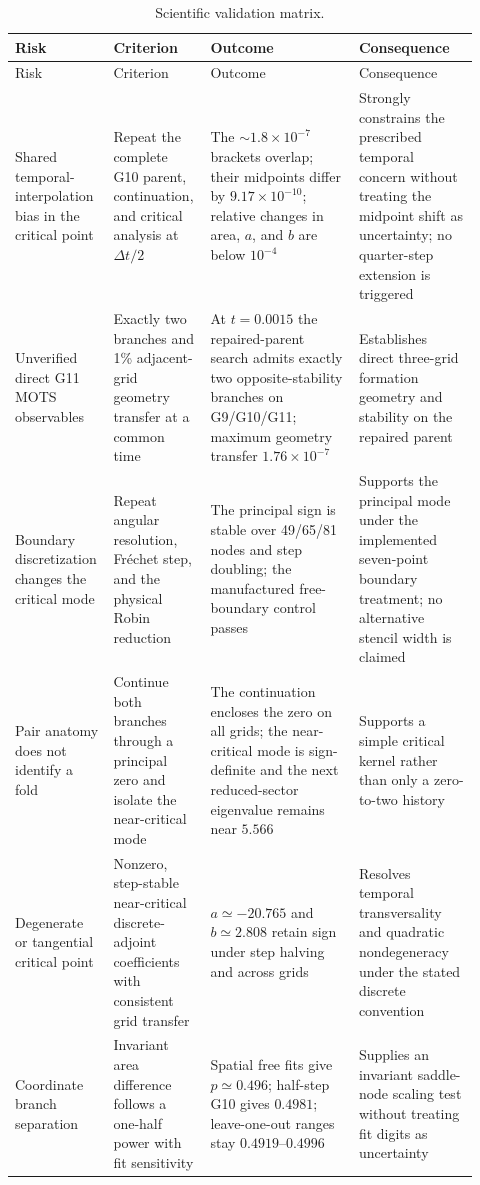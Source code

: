 \documentclass[11pt]{article}
\begin{document}
\renewcommand{\arraystretch}{1.18}
\small
\begin{longtable}{@{}L{0.17\linewidth}L{0.19\linewidth}L{0.31\linewidth}L{0.25\linewidth}@{}}
\caption{Scientific validation matrix.}\label{tab:validation}\\
\toprule
Risk & Criterion & Outcome & Consequence \\
\midrule
\endfirsthead
\toprule
Risk & Criterion & Outcome & Consequence \\
\midrule
\endhead
Shared temporal-interpolation bias in the critical point & Repeat the complete G10 parent, continuation, and critical analysis at $\Delta t/2$ & The $\sim1.8\times10^{-7}$ brackets overlap; their midpoints differ by $9.17\times10^{-10}$; relative changes in area, $a$, and $b$ are below $10^{-4}$ & Strongly constrains the prescribed temporal concern without treating the midpoint shift as uncertainty; no quarter-step extension is triggered \\
Unverified direct G11 MOTS observables & Exactly two branches and 1\% adjacent-grid geometry transfer at a common time & At $t=0.0015$ the repaired-parent search admits exactly two opposite-stability branches on G9/G10/G11; maximum geometry transfer $1.76\times10^{-7}$ & Establishes direct three-grid formation geometry and stability on the repaired parent \\
Boundary discretization changes the critical mode & Repeat angular resolution, Fr\'echet step, and the physical Robin reduction & The principal sign is stable over 49/65/81 nodes and step doubling; the manufactured free-boundary control passes & Supports the principal mode under the implemented seven-point boundary treatment; no alternative stencil width is claimed \\
Pair anatomy does not identify a fold & Continue both branches through a principal zero and isolate the near-critical mode & The continuation encloses the zero on all grids; the near-critical mode is sign-definite and the next reduced-sector eigenvalue remains near $5.566$ & Supports a simple critical kernel rather than only a zero-to-two history \\
Degenerate or tangential critical point & Nonzero, step-stable near-critical discrete-adjoint coefficients with consistent grid transfer & $a\simeq-20.765$ and $b\simeq2.808$ retain sign under step halving and across grids & Resolves temporal transversality and quadratic nondegeneracy under the stated discrete convention \\
Coordinate branch separation & Invariant area difference follows a one-half power with fit sensitivity & Spatial free fits give $p\simeq0.496$; half-step G10 gives $0.4981$; leave-one-out ranges stay $0.4919$--$0.4996$ & Supplies an invariant saddle-node scaling test without treating fit digits as uncertainty \\

\end{longtable}
\end{document}
